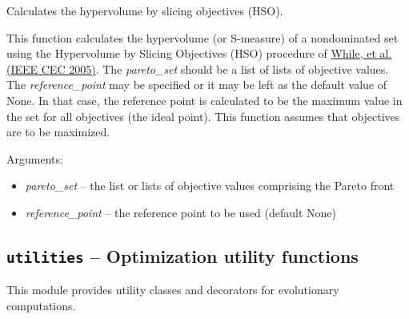 \documentclass[letterpaper,10pt,english]{sphinxmanual}
\begin{document}

\begin{fulllineitems}
\label{reference:inspyred.ec.analysis.hypervolume}
Calculates the hypervolume by slicing objectives (HSO).

This function calculates the hypervolume (or S-measure) of a nondominated
set using the Hypervolume by Slicing Objectives (HSO) procedure of \href{http://www.lania.mx/~ccoello/EMOO/while05a.pdf.gz}{While, et al. 
(IEEE CEC 2005)}.
The \emph{pareto\_set} should be a list of lists of objective values.
The \emph{reference\_point} may be specified or it may be left as the default 
value of None. In that case, the reference point is calculated to be the
maximum value in the set for all objectives (the ideal point). This function 
assumes that objectives are to be maximized.

Arguments:
\begin{itemize}
\item {} 
\emph{pareto\_set} -- the list or lists of objective values comprising the Pareto front

\item {} 
\emph{reference\_point} -- the reference point to be used (default None)

\end{itemize}

\end{fulllineitems}

\label{reference:module-inspyred.ec.utilities}

\subsection{\texttt{utilities} -- Optimization utility functions}
\label{reference:utilities-optimization-utility-functions}
This module provides utility classes and decorators for evolutionary computations.
\label{reference:module-utilities}
\end{document}
